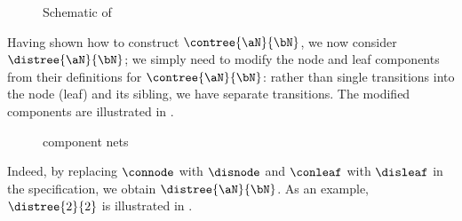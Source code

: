 \begin{figure}[ht]
{
}
\caption{Schematic of } \label{fig:treeconschematic}
\label{fig:treeconSchematic}
\end{figure}

Having shown how to construct $\contree{\aN}{\bN}$, we now consider
$\distree{\aN}{\bN}$; we simply need to modify the node and leaf components
from their definitions for $\contree{\aN}{\bN}$: rather than single
transitions into the node (leaf) and its sibling, we have separate transitions.
The modified components are illustrated in .


\begin{figure}[ht]
\centering
\begin{subfigure}{0.5\textwidth}
\centering
\usebox\disNodeBox
\caption{\component{\disnode} }
\end{subfigure}%
\begin{subfigure}{0.5\textwidth}
\centering
\usebox\disLeafBox
\caption{\component{\disleaf} }
\end{subfigure}%
\caption{\distree{\aN}{\bN} component nets}
\label{fig:disTreeComponents}
\end{figure}

Indeed, by replacing $\connode$ with $\disnode$ and $\conleaf$ with $\disleaf$
in the specification, we obtain $\distree{\aN}{\bN}$. As an example,
$\distree{2}{2}$ is illustrated in .

